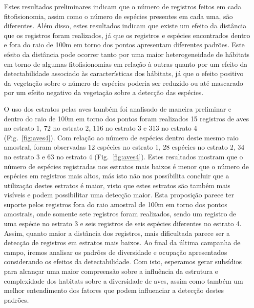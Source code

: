 Estes resultados preliminares indicam que o número de registros feitos
em cada fitofisionomia, assim como o número de espécies presentes em
cada uma, são diferentes. Além disso, estes resultados indicam que
existe um efeito da distância que os registros foram realizados, já
que os registros e espécies encontrados dentro e fora do raio de 100m
em torno dos pontos apresentam diferentes padrões. Este efeito da
distância pode ocorrer tanto por uma maior heterogeneidade de hábitats
em torno de algumas fitofisionomias em relação à outras quanto por um
efeito da detectabilidade associado às características dos hábitats,
já que o efeito positivo da vegetação sobre o número de espécies
poderia ser reduzido ou até mascarado por um efeito negativo da
vegetação sobre a detecção das espécies.

O uso dos estratos pelas aves também foi analisado de maneira
preliminar e dentro do raio de 100m em torno dos pontos foram
realizados 15 registros de aves no estrato 1, 72 no estrato 2, 116 no
estrato 3 e 313 no estrato 4 (Fig.~\ref{fig:aves4}). Com relação ao número de
espécies dentro deste mesmo raio amostral, foram observadas 12
espécies no estrato 1, 28 espécies no estrato 2, 34 no estrato 3 e 63
no estrato 4 (Fig.~\ref{fig:aves4}). Estes resultados mostram que o número de
espécies registradas nos estratos mais baixos é menor que o número de
espécies em registros mais altos, más isto não nos possibilita
concluir que a utilização destes estratos é maior, visto que estes
estratos são também mais visíveis e podem possibilitar uma detecção
maior. Esta proposição parece ter suporte pelos registros fora do raio
amostral de 100m em torno dos pontos amostrais, onde somente sete
registros foram realizados, sendo um registro de uma espécie no
estrato 3 e seis registros de seis espécies diferentes no estrato
4. Assim, quanto maior a distância dos registros, mais dificultada
parece ser a detecção de registros em estratos mais baixos. Ao final
da última campanha de campo, iremos analisar os padrões de diversidade
e ocupação apresentados considerando os efeitos da
detectabilidade. Com isto, esperamos gerar subsídios para alcançar uma
maior compreensão sobre a influência da estrutura e complexidade dos
habitats sobre a diversidade de aves, assim como também um melhor
entendimento dos fatores que podem influenciar a detecção destes
padrões.